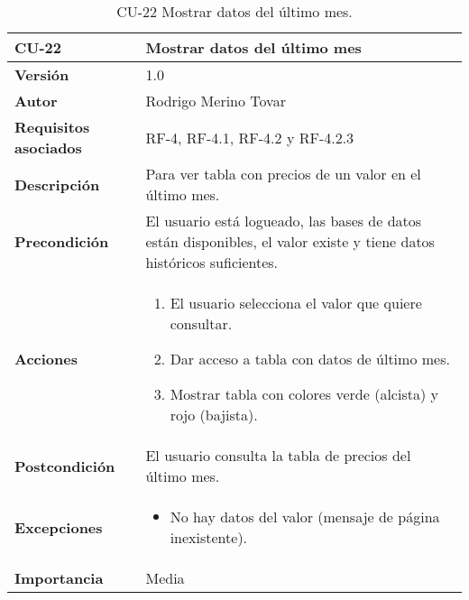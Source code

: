 \begin{table}[p]
	\centering
	\begin{tabularx}{\linewidth}{ p{} p{} }
		\toprule
		\textbf{CU-22}    & \textbf{Mostrar datos del último mes}\\
		\toprule
		\textbf{Versión}              & 1.0    \\
		\textbf{Autor}                & Rodrigo Merino Tovar \\
		\textbf{Requisitos asociados} & RF-4, RF-4.1, RF-4.2 y RF-4.2.3 \\
		\textbf{Descripción}          & Para ver tabla con precios de un valor en el último mes.\\
		\textbf{Precondición}         & El usuario está logueado, las bases de datos están disponibles, el valor existe y tiene datos históricos suficientes.  \\
		\textbf{Acciones}             &
		\begin{enumerate}
			\def\labelenumi{\arabic{enumi}.}
			\tightlist 
			\item El usuario selecciona el valor que quiere consultar. 
			\item Dar acceso a tabla con datos de último mes.
			\item Mostrar tabla con colores verde (alcista) y rojo (bajista).
		\end{enumerate}\\
		\textbf{Postcondición}        & El usuario consulta la tabla de precios del último mes. \\
		\textbf{Excepciones}          & 
		\begin{itemize}
			\tightlist
			\item No hay datos del valor (mensaje de página inexistente).
		\end{itemize} \\
		\textbf{Importancia}          & Media \\
		\bottomrule
	\end{tabularx}
	\caption{CU-22 Mostrar datos del último mes.}
\end{table}


